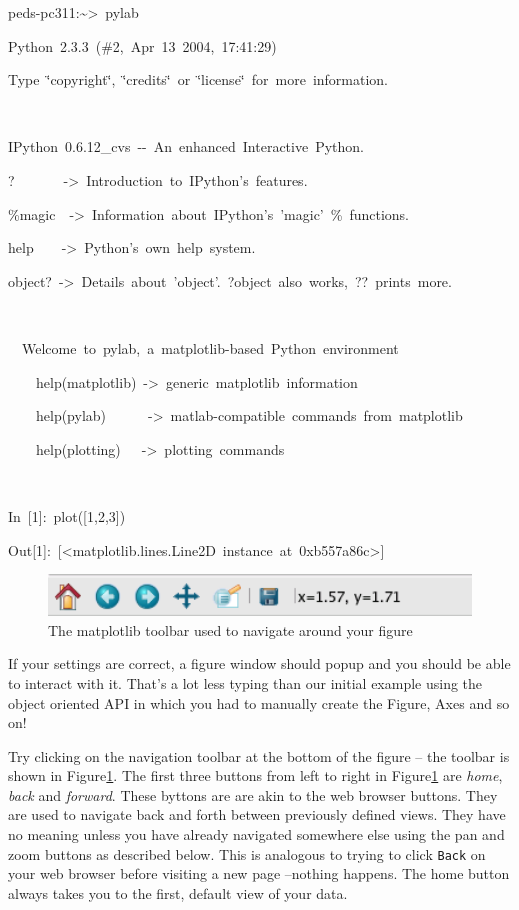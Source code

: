 \begin{lyxcode}
peds-pc311:\textasciitilde{}>~pylab

Python~2.3.3~(\#2,~Apr~13~2004,~17:41:29)

Type~\char`\"{}copyright\char`\"{},~\char`\"{}credits\char`\"{}~or~\char`\"{}license\char`\"{}~for~more~information.

~

IPython~0.6.12\_cvs~-{}-~An~enhanced~Interactive~Python.

?~~~~~~~->~Introduction~to~IPython's~features.

\%magic~~->~Information~about~IPython's~'magic'~\%~functions.

help~~~~->~Python's~own~help~system.

object?~->~Details~about~'object'.~?object~also~works,~??~prints~more.

~

~~Welcome~to~pylab,~a~matplotlib-based~Python~environment

~~~~help(matplotlib)~->~generic~matplotlib~information

~~~~help(pylab)~~~~~~->~matlab-compatible~commands~from~matplotlib

~~~~help(plotting)~~~->~plotting~commands

~

In~{[}1]:~plot({[}1,2,3])

Out{[}1]:~{[}<matplotlib.lines.Line2D~instance~at~0xb557a86c>]
\end{lyxcode}
%
\begin{figure}
\begin{centering}
\includegraphics[width=5in]{fig/mpl_toolbar}
\par\end{centering}

\caption{\label{fig:mpl_toolbar}The matplotlib toolbar used to navigate around
your figure}

\end{figure}


If your settings are correct, a figure window should popup and you
should be able to interact with it. That's a lot less typing than
our initial example using the object oriented API in which you had
to manually create the Figure, Axes and so on!

Try clicking on the navigation toolbar at the bottom of the figure
-- the toolbar is shown in Figure\ref{fig:mpl_toolbar}. The first
three buttons from left to right in Figure\ref{fig:mpl_toolbar} are
\textit{home}, \textit{back} and \textit{forward}. These byttons are
are akin to the web browser buttons. They are used to navigate back
and forth between previously defined views. They have no meaning unless
you have already navigated somewhere else using the pan and zoom buttons
as described below. This is analogous to trying to click \texttt{Back}
on your web browser before visiting a new page --nothing happens.
The home button always takes you to the first, default view of your
data. 

